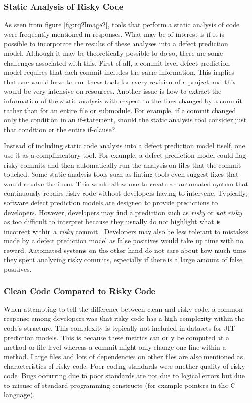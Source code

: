 \documentclass[../main.tex]{subfiles}
\begin{document}
\subsubsection{Static Analysis of Risky Code}

As seen from figure \ref{fig:rq2Image2}, tools that perform a static analysis of code were frequently mentioned in responses. What may be of interest is if it is possible to incorporate the results of these analyses into a defect prediction model. Although it may be theoretically possible to do so, there are some challenges associated with this. First of all, a commit-level defect prediction model requires that each commit includes the same information. This implies that one would have to run these tools for every revision of a project and this would be very intensive on resources. Another issue is how to extract the information of the static analysis with respect to the lines changed by a commit rather than for an entire file or submodule. For example, if a commit changed only the condition in an if-statement, should the static analysis tool consider just that condition or the entire if-clause? 

Instead of including static code analysis into a defect prediction model itself, one use it as a complimentary tool. For example, a defect prediction model could flag risky commits and then automatically run the analysis on files that the commit touched. Some static analysis tools such as linting tools even suggest fixes that would resolve the issue. This would allow one to create an automated system that continuously repairs risky code without developers having to intervene. Typically, software defect prediction models are designed to provide predictions to developers. However, developers may find a prediction such as \textit{risky} or \textit{not risky} as too difficult to interpret because they usually do not highlight what is incorrect within a \textit{risky} commit \cite{nayrolles2018clever}. Developers may also be less tolerant to mistakes made by a defect prediction model as false positives would take up time with no reward. Automated systems on the other hand do not care about how much time they spent analyzing risky commits, especially if there is a large amount of false positives. 

\subsubsection{Clean Code Compared to Risky Code}

When attempting to tell the difference between clean and risky code, a common response among developers was that risky code has a high complexity within the code's structure. This complexity is typically not included in datasets for JIT prediction models. This is because these metrics can only be computed at a method or file level whereas a commit might only change one line within a method. Large files and lots of dependencies on other files are also mentioned as characteristics of risky code. Poor coding standards were another quality of risky code. Bugs occurring due to poor standards are not due to logical errors but due to misuse of standard programming constructs (for example pointers in the C language).
\end{document}
